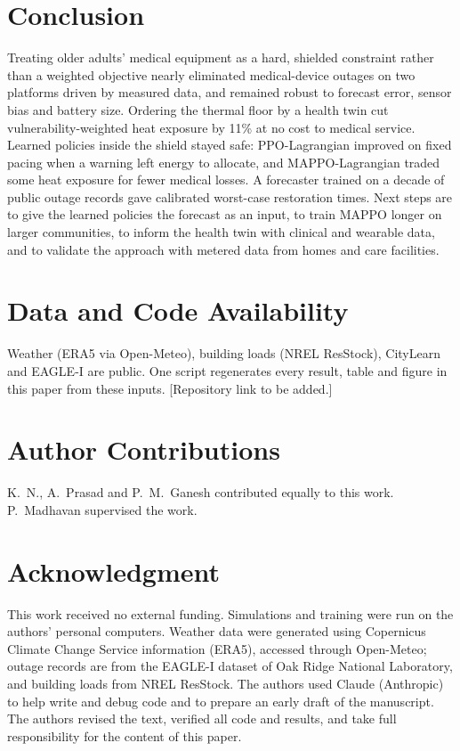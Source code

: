 \documentclass[conference]{IEEEtran}
\begin{document}
\section{Conclusion}
Treating older adults' medical equipment as a hard, shielded constraint rather than a weighted objective nearly eliminated medical-device outages on two platforms driven by measured data, and remained robust to forecast error, sensor bias and battery size. Ordering the thermal floor by a health twin cut vulnerability-weighted heat exposure by 11\% at no cost to medical service. Learned policies inside the shield stayed safe: PPO-Lagrangian improved on fixed pacing when a warning left energy to allocate, and MAPPO-Lagrangian traded some heat exposure for fewer medical losses. A forecaster trained on a decade of public outage records gave calibrated worst-case restoration times. Next steps are to give the learned policies the forecast as an input, to train MAPPO longer on larger communities, to inform the health twin with clinical and wearable data, and to validate the approach with metered data from homes and care facilities.

\section*{Data and Code Availability}
Weather (ERA5 via Open-Meteo), building loads (NREL ResStock), CityLearn and EAGLE-I are public. One script regenerates every result, table and figure in this paper from these inputs. [Repository link to be added.]

\section*{Author Contributions}
K.~N., A.~Prasad and P.~M.~Ganesh contributed equally to this work. P.~Madhavan supervised the work. %

\section*{Acknowledgment}
This work received no external funding. Simulations and training were run on the authors' personal computers. Weather data were generated using Copernicus Climate Change Service information (ERA5), accessed through Open-Meteo; outage records are from the EAGLE-I dataset of Oak Ridge National Laboratory, and building loads from NREL ResStock. The authors used Claude (Anthropic) to help write and debug code and to prepare an early draft of the manuscript. The authors revised the text, verified all code and results, and take full responsibility for the content of this paper.



\end{document}
